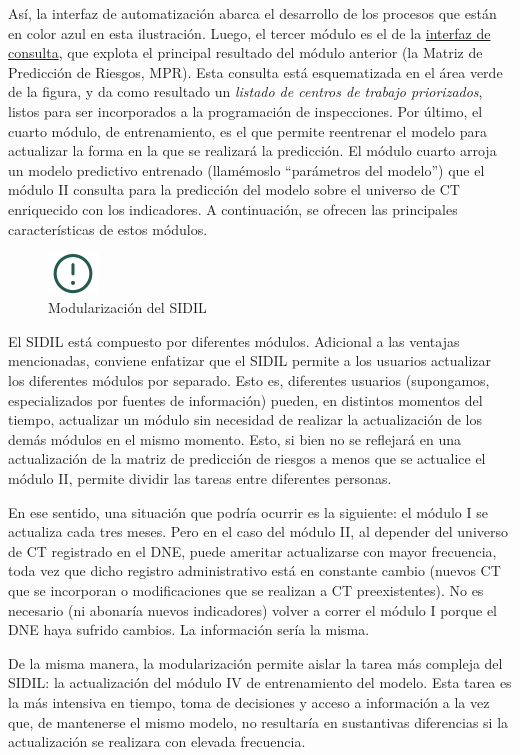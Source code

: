 \documentclass[
]{article}
\begin{document}
Así, la interfaz de automatización abarca el desarrollo de los procesos que están en color azul en esta ilustración. Luego, el tercer módulo es el de la \protect\hyperlink{interfazConsultaexplicaciongeneral}{interfaz de consulta}, que explota el principal resultado del módulo anterior (la Matriz de Predicción de Riesgos, MPR). Esta consulta está esquematizada en el área verde de la figura, y da como resultado un \emph{listado de centros de trabajo priorizados}, listos para ser incorporados a la programación de inspecciones. Por último, el cuarto módulo, de entrenamiento, es el que permite reentrenar el modelo para actualizar la forma en la que se realizará la predicción. El módulo cuarto arroja un modelo predictivo entrenado (llamémoslo ``parámetros del modelo'') que el módulo II consulta para la predicción del modelo sobre el universo de CT enriquecido con los indicadores. A continuación, se ofrecen las principales características de estos módulos.

\begin{figure}
\includegraphics[width=50px,style="float:left; background-color: #f5f5f5; padding-right:1em"]{images-1/important-icon} \caption{Modularización del SIDIL}\label{fig:modularizacionSIDIL}
\end{figure}

\begin{rmdcomment}
El SIDIL está compuesto por diferentes módulos. Adicional a las ventajas
mencionadas, conviene enfatizar que el SIDIL permite a los usuarios
actualizar los diferentes módulos por separado. Esto es, diferentes
usuarios (supongamos, especializados por fuentes de información) pueden,
en distintos momentos del tiempo, actualizar un módulo sin necesidad de
realizar la actualización de los demás módulos en el mismo momento.
Esto, si bien no se reflejará en una actualización de la matriz de
predicción de riesgos a menos que se actualice el módulo II, permite
dividir las tareas entre diferentes personas.

En ese sentido, una situación que podría ocurrir es la siguiente: el
módulo I se actualiza cada tres meses. Pero en el caso del módulo II, al
depender del universo de CT registrado en el DNE, puede ameritar
actualizarse con mayor frecuencia, toda vez que dicho registro
administrativo está en constante cambio (nuevos CT que se incorporan o
modificaciones que se realizan a CT preexistentes). No es necesario (ni
abonaría nuevos indicadores) volver a correr el módulo I porque el DNE
haya sufrido cambios. La información sería la misma.

De la misma manera, la modularización permite aislar la tarea más
compleja del SIDIL: la actualización del módulo IV de entrenamiento del
modelo. Esta tarea es la más intensiva en tiempo, toma de decisiones y
acceso a información a la vez que, de mantenerse el mismo modelo, no
resultaría en sustantivas diferencias si la actualización se realizara
con elevada frecuencia.
\end{rmdcomment}
\end{document}
